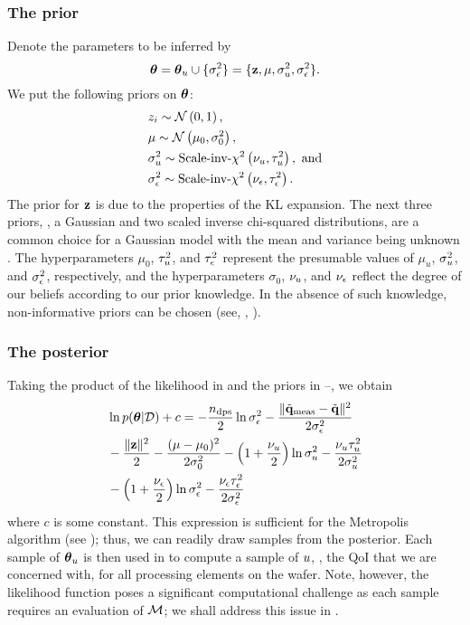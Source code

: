 \subsubsection{The prior}
Denote the parameters to be inferred by
\[
  {\boldsymbol\theta} = {\boldsymbol\theta}_u \cup \{ \sigma_\epsilon^2 \} = \{ \mathbf{z}, \mu, \sigma_u^2, \sigma_\epsilon^2 \}.
\]
We put the following priors on ${\boldsymbol\theta}$:
\begin{align}
  & \z_i \sim \gaussian{0}{1}, \elabel{z-prior} \\
  & \mu \sim \gaussian{\mu_0}{\sigma^2_0}, \elabel{mu-u-prior} \\
  & \sigma^2_\u \sim \sichisquared{\nu_\u}{\tau^2_\u}, \text{ and} \elabel{sigma2-u-prior} \\
  & \sigma^2_\noise \sim \sichisquared{\nu_\noise}{\tau^2_\noise}. \elabel{sigma2-noise-prior}
\end{align}
The prior for $\mathbf{z}$ is due to the properties of the KL expansion. The next three priors, \ie, a Gaussian and two scaled inverse chi-squared distributions, are a common choice for a Gaussian model with the mean and variance being unknown \cite{gelman2004}. The hyperparameters $\mu_0$, $\tau^2_u$, and $\tau^2_\epsilon$ represent the presumable values of $\mu_u$, $\sigma^2_u$, and $\sigma^2_\epsilon$, respectively, and the hyperparameters $\sigma_0$, $\nu_u$, and $\nu_\epsilon$ reflect the degree of our beliefs according to our prior knowledge. In the absence of such knowledge, non-informative priors can be chosen (see, \eg, \cite{gelman2004}).

\subsubsection{The posterior}
Taking the product of the likelihood in  and the priors in --, we obtain
\begin{align}
  & \ln \f{\vparam | \Data} + c = -\frac{\ndps}{2} \ln \sigma^2_\noise - \frac{\norm{\mvT_\meas - \mvT}^2}{2 \sigma^2_\noise} \nonumber \\
  & {} - \frac{\norm{\vz}^2}{2} - \frac{(\mu - \mu_0)^2}{2 \sigma^2_0} - \left(1 + \frac{\nu_\u}{2}\right) \ln \sigma^2_\u - \frac{\nu_\u \tau_\u^2}{2 \sigma^2_\u} \nonumber \\
  & {} - \left(1 + \frac{\nu_\noise}{2}\right) \ln \sigma^2_\noise - \frac{\nu_\noise \tau_\noise^2}{2 \sigma^2_\noise} \elabel{log-posterior}
\end{align}
where $c$ is some constant. This expression is sufficient for the Metropolis algorithm (see ); thus, we can readily draw samples from the posterior. Each sample of ${\boldsymbol\theta}_u$ is then used in  to compute a sample of $u$, \ie, the QoI that we are concerned with, for all processing elements on the wafer.
Note, however, the likelihood function poses a significant computational challenge as each sample requires an evaluation of $\model$; we shall address this issue in .
